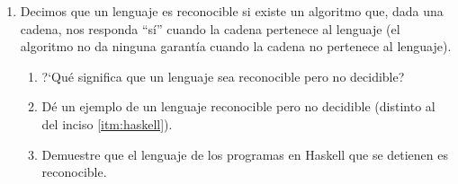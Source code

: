 \documentclass{article}
\begin{document}
\begin{enumerate}
  
\item Decimos que un lenguaje es reconocible si existe un
  algoritmo que, dada una cadena, nos responda ``s\'i'' cuando la
  cadena pertenece al lenguaje (el algoritmo no da ninguna garant\'ia cuando la
  cadena no pertenece al lenguaje).
  \begin{enumerate}
  \item ?`Qu\'e significa que un lenguaje sea reconocible pero no decidible?
  \item D\'e un ejemplo de un lenguaje reconocible pero no decidible (distinto
    al del inciso \ref{itm:haskell}).
  \item \label{itm:haskell} Demuestre que el lenguaje de los programas en Haskell que se detienen es reconocible.
  \end{enumerate}
  
\end{enumerate}
\end{document}

